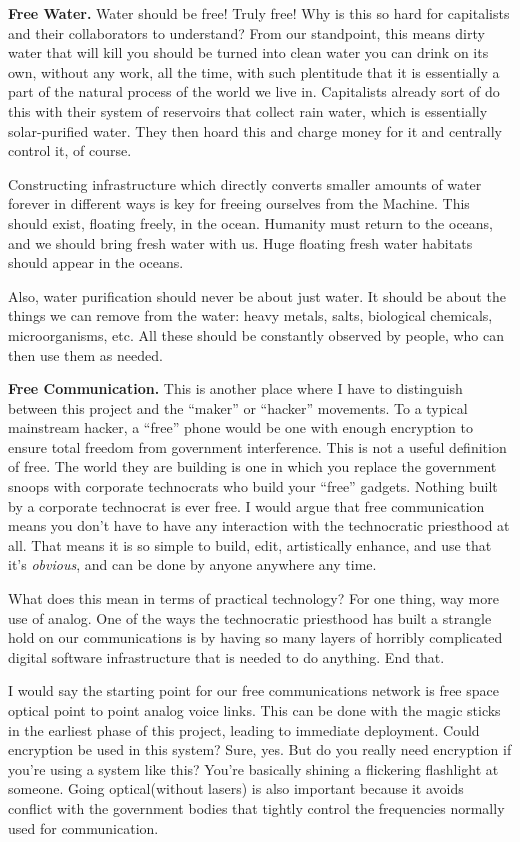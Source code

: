 \textbf{Free Water.} Water should be free! Truly free! Why is this so
hard for capitalists and their collaborators to understand? From our
standpoint, this means dirty water that will kill you should be turned
into clean water you can drink on its own, without any work, all the
time, with such plentitude that it is essentially a part of the natural
process of the world we live in. Capitalists already sort of do this
with their system of reservoirs that collect rain water, which is
essentially solar-purified water. They then hoard this and charge money
for it and centrally control it, of course.

Constructing infrastructure which directly converts smaller amounts of
water forever in different ways is key for freeing ourselves from the
Machine. This should exist, floating freely, in the ocean. Humanity must
return to the oceans, and we should bring fresh water with us. Huge
floating fresh water habitats should appear in the oceans.

Also, water purification should never be about just water. It should be
about the things we can remove from the water: heavy metals, salts,
biological chemicals, microorganisms, etc. All these should be
constantly observed by people, who can then use them as needed.

\textbf{Free Communication.} This is another place where I have to
distinguish between this project and the ``maker'' or ``hacker''
movements. To a typical mainstream hacker, a ``free'' phone would be one
with enough encryption to ensure total freedom from government
interference. This is not a useful definition of free. The world they
are building is one in which you replace the government snoops with
corporate technocrats who build your ``free'' gadgets. Nothing built by
a corporate technocrat is ever free. I would argue that free
communication means you don't have to have any interaction with the
technocratic priesthood at all. That means it is so simple to build,
edit, artistically enhance, and use that it's \emph{obvious}, and can be
done by anyone anywhere any time.

What does this mean in terms of practical technology? For one thing, way
more use of analog. One of the ways the technocratic priesthood has
built a strangle hold on our communications is by having so many layers
of horribly complicated digital software infrastructure that is needed
to do anything. End that.

I would say the starting point for our free communications network is
free space optical point to point analog voice links. This can be done
with the magic sticks in the earliest phase of this project, leading to
immediate deployment. Could encryption be used in this system? Sure,
yes. But do you really need encryption if you're using a system like
this? You're basically shining a flickering flashlight at someone. Going
optical(without lasers) is also important because it avoids conflict
with the government bodies that tightly control the frequencies normally
used for communication.

